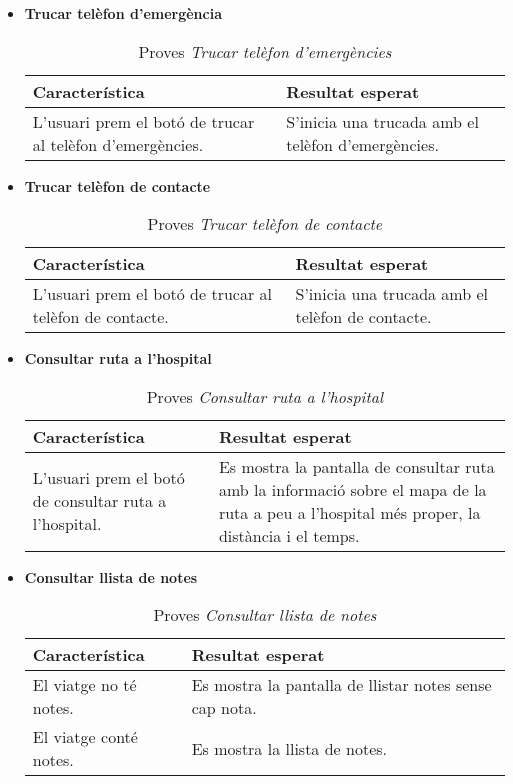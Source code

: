 \begin{itemize}
\clearpage

\item{}\textbf{Trucar telèfon d'emergència}

\begin{table}[!h]
\centering
\begin{tabular}{|T|T|}
\hline
\textbf{Característica}  & \textbf{Resultat esperat} \\\hline
L'usuari prem el botó de trucar al telèfon d'emergències. & S'inicia una trucada amb el telèfon d'emergències.\\\hline
\end{tabular}
\label{}
\caption{Proves \textit{Trucar telèfon d'emergències}}
\end{table}

\item{}\textbf{Trucar telèfon de contacte}

\begin{table}[!h]
\centering
\begin{tabular}{|T|T|}
\hline
\textbf{Característica}  & \textbf{Resultat esperat} \\\hline
L'usuari prem el botó de trucar al telèfon de contacte. & S'inicia una trucada amb el telèfon de contacte.\\\hline
\end{tabular}
\label{}
\caption{Proves \textit{Trucar telèfon de contacte}}
\end{table}


\item{}\textbf{Consultar ruta a l'hospital}

\begin{table}[!h]
\centering
\begin{tabular}{|T|T|}
\hline
\textbf{Característica}  & \textbf{Resultat esperat} \\\hline
L'usuari prem el botó de consultar ruta a l'hospital. & Es mostra la pantalla de consultar ruta amb la informació sobre el mapa de la ruta a peu a l'hospital més proper, la distància i el temps.\\\hline
\end{tabular}
\label{}
\caption{Proves \textit{Consultar ruta a l'hospital}}
\end{table}

\item{}\textbf{Consultar llista de notes}

\begin{table}[!h]
\centering
\begin{tabular}{|T|T|}
\hline
\textbf{Característica}  & \textbf{Resultat esperat} \\\hline
El viatge no té notes. & Es mostra la pantalla de llistar notes sense cap nota.\\\hline
El viatge conté notes. & Es mostra la llista de notes.\\\hline
\end{tabular}
\label{}
\caption{Proves \textit{Consultar llista de notes}}
\end{table}


\end{itemize}

